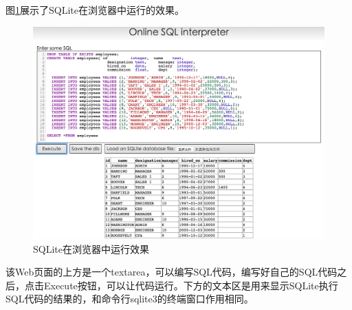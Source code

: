 图\ref{sqlite-html}展示了SQLite在浏览器中运行的效果。

\begin{figure}[h!] %
    \centering
    \includegraphics[width=450bp]{figure/pic/sqlite-sample-html.png}
    \caption{SQLite在浏览器中运行效果}
    \label{sqlite-html}
\end{figure}

该Web页面的上方是一个textarea，可以编写SQL代码，编写好自己的SQL代码之后，点击Execute按钮，可以让代码运行。下方的文本区是用来显示SQLite执行SQL代码的结果的，和命令行sqlite3的终端窗口作用相同。